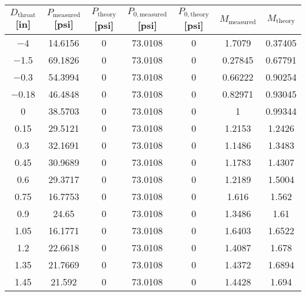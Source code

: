 \begin{tabular}{ccccccc}
\toprule
$D_\text{throat}$ [\unit{in}] & $P_\text{measured}$ [\unit{psi}] & $P_\text{theory}$ [\unit{psi}] & $P_{0,\text{measured}}$ [\unit{psi}] & $P_{0,\text{theory}}$ [\unit{psi}] & $M_\text{measured}$ & $M_\text{theory}$ \\
\midrule
\num{-4} & \num{14.6156} & \num{0} & \num{73.0108} & \num{0} & \num{1.7079} & \num{0.37405} \\ 
\num{-1.5} & \num{69.1826} & \num{0} & \num{73.0108} & \num{0} & \num{0.27845} & \num{0.67791} \\ 
\num{-0.3} & \num{54.3994} & \num{0} & \num{73.0108} & \num{0} & \num{0.66222} & \num{0.90254} \\ 
\num{-0.18} & \num{46.4848} & \num{0} & \num{73.0108} & \num{0} & \num{0.82971} & \num{0.93045} \\ 
\num{0} & \num{38.5703} & \num{0} & \num{73.0108} & \num{0} & \num{1} & \num{0.99344} \\ 
\num{0.15} & \num{29.5121} & \num{0} & \num{73.0108} & \num{0} & \num{1.2153} & \num{1.2426} \\ 
\num{0.3} & \num{32.1691} & \num{0} & \num{73.0108} & \num{0} & \num{1.1486} & \num{1.3483} \\ 
\num{0.45} & \num{30.9689} & \num{0} & \num{73.0108} & \num{0} & \num{1.1783} & \num{1.4307} \\ 
\num{0.6} & \num{29.3717} & \num{0} & \num{73.0108} & \num{0} & \num{1.2189} & \num{1.5004} \\ 
\num{0.75} & \num{16.7753} & \num{0} & \num{73.0108} & \num{0} & \num{1.616} & \num{1.562} \\ 
\num{0.9} & \num{24.65} & \num{0} & \num{73.0108} & \num{0} & \num{1.3486} & \num{1.61} \\ 
\num{1.05} & \num{16.1771} & \num{0} & \num{73.0108} & \num{0} & \num{1.6403} & \num{1.6522} \\ 
\num{1.2} & \num{22.6618} & \num{0} & \num{73.0108} & \num{0} & \num{1.4087} & \num{1.678} \\ 
\num{1.35} & \num{21.7669} & \num{0} & \num{73.0108} & \num{0} & \num{1.4372} & \num{1.6894} \\ 
\num{1.45} & \num{21.592} & \num{0} & \num{73.0108} & \num{0} & \num{1.4428} & \num{1.694} \\ 
\bottomrule
\end{tabular}